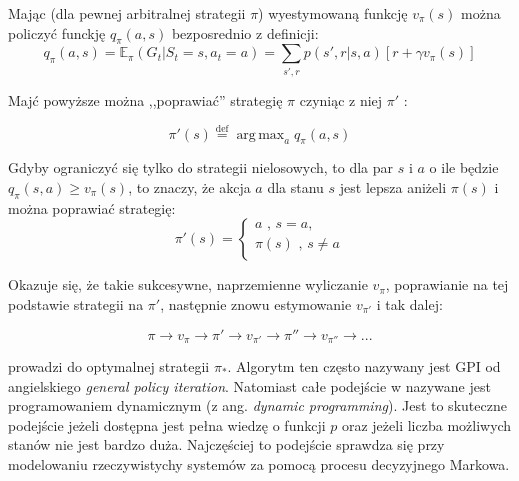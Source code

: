\documentclass[licencjacka]{pracamgr}
\DeclareMathOperator*{\argmax}{arg\,max}
\begin{document}
Mając (dla pewnej arbitralnej strategii $\pi$) wyestymowaną funkcję $v_{\pi}(s)$  można policzyć  funckję $q_{\pi}(a,s)$ bezposrednio z definicji:
$$q_{\pi}(a,s)=\mathbb{E}_{\pi}(G_{t}| S_{t} = s, a_{t} = a)  =  \sum_{s',r}p(s',r|s, a)[r+\gamma v_{\pi}(s)]$$

Majć powyższe można  ,,poprawiać'' strategię $\pi$ czyniąc z niej $\pi'$ : 

\begin{equation}\label{update1}
	\pi'(s)\stackrel{\text{def}}{=}\argmax_{a}q_{\pi}(a,s)
\end{equation}


Gdyby ograniczyć się tylko do strategii nielosowych, to dla par  $s$ i $a$ o ile będzie $q_{\pi}(s,a)\geq v_{\pi}(s)$, to znaczy, że akcja $a$  dla stanu $s$ jest lepsza aniżeli $\pi(s)$ i można poprawiać strategię: 
$$\pi'(s) =
	\begin{cases}
		a\text{ ,  }s=a,\\			
		\pi(s)\text{ , } s\neq a\\
	\end{cases}
$$

Okazuje się, że takie sukcesywne, naprzemienne wyliczanie $v_{\pi}$, poprawianie na tej podstawie strategii na $\pi'$, następnie znowu estymowanie $v_{\pi'}$ i tak dalej:

\begin{equation}\label{update2}
 	\pi\rightarrow v_{\pi}\rightarrow \pi' \rightarrow v_{\pi'} \rightarrow \pi'' \rightarrow v_{\pi''} \rightarrow...
\end{equation}


prowadzi do optymalnej strategii $\pi_{*}$.  Algorytm ten często nazywany jest GPI od angielskiego \textit{general policy iteration}. Natomiast całe podejście w \cite{RL} nazywane jest programowaniem dynamicznym (z ang. \textit{dynamic programming}). Jest to skuteczne podejście jeżeli dostępna jest  pełna wiedzę o funkcji $p$ oraz jeżeli liczba możliwych stanów nie jest bardzo duża. Najczęściej to podejście sprawdza się przy modelowaniu rzeczywistychy systemów za pomocą procesu decyzyjnego Markowa.\\
\end{document}
